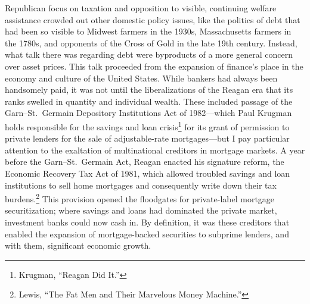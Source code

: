 \documentclass[
]{article}
\let\rmarkdownfootnote\footnote%
\def\footnote{\protect\rmarkdownfootnote}
\begin{document}
Republican focus on taxation and opposition to visible, continuing
welfare assistance crowded out other domestic policy issues, like the
politics of debt that had been so visible to Midwest farmers in the
1930s, Massachusetts farmers in the 1780s, and opponents of the Cross of
Gold in the late 19th century. Instead, what talk there was regarding
debt were byproducts of a more general concern over asset prices. This
talk proceeded from the expansion of finance's place in the economy and
culture of the United States. While bankers had always been handsomely
paid, it was not until the liberalizations of the Reagan era that its
ranks swelled in quantity and individual wealth. These included passage
of the Garn--St.~Germain Depository Institutions Act of 1982---which
Paul Krugman holds responsible for the savings and loan crisis\footnote{Krugman,
  ``Reagan Did It.''} for its grant of permission to private lenders for
the sale of adjustable-rate mortgages---but I pay particular attention
to the exaltation of multinational creditors in mortgage markets. A year
before the Garn--St.~Germain Act, Reagan enacted his signature reform,
the Economic Recovery Tax Act of 1981, which allowed troubled savings
and loan institutions to sell home mortgages and consequently write down
their tax burdens.\footnote{Lewis, ``The Fat Men and Their Marvelous
  Money Machine.''} This provision opened the floodgates for
private-label mortgage securitization; where savings and loans had
dominated the private market, investment banks could now cash in. By
definition, it was these creditors that enabled the expansion of
mortgage-backed securities to subprime lenders, and with them,
significant economic growth.
\end{document}
